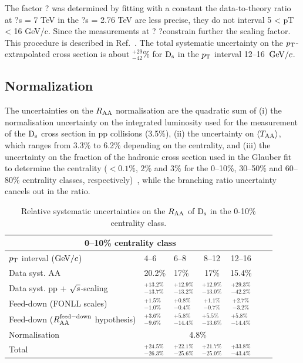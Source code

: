 The factor ? was determined by fitting with a constant the data-to-theory ratio at ?s = 7 TeV in the
?s = 2.76 TeV are less precise, they do not interval 5 < pT < 16 GeV/c. Since the measurements at ?
?constrain further the scaling factor. 
\fi
This procedure is described in Ref.~\cite{Adam:2015sza}. The total 
systematic uncertainty on the $p_{\rm T}$-extrapolated cross section is about 
$^{+29}_{-42}\%$ for ${\rm D_s}$ in the $p_{\rm T}$ interval 12--16~$\mathrm{GeV}/c$.


\subsection{Normalization}
\label{sec:NormalizSyst}
The uncertainties on the $R_{\rm AA}$ normalisation are the quadratic sum of 
(i) the normalisation uncertainty on the integrated luminosity used for the measurement of the ${\rm D_s}$ cross section in pp collisions (3.5\%), 
(ii) the uncertainty on $\langle T_{\rm AA} \rangle$, which ranges from 3.3\% to 6.2\% depending on the centrality, and
(iii) the uncertainty on the fraction of the hadronic cross section used in the 
Glauber fit to determine the centrality ($<0.1\%$, $2\%$ and $3\%$ for the 0--10\%, 30--50\% 
and 60--80\% centrality classes, respectively)~\cite{Adam:2015sza}, while the branching ratio uncertainty cancels out in the 
ratio.

\begin{table}[!h]
\centering
\begin{tabular}{|l|l|l|c|c|c|c|}
\hline
\multicolumn{5}{|c|}{0--10\% centrality class}       \\                                                                                                                                                                                                                                               \hline
$p_{\rm T}$ interval ($\mathrm{GeV}/c$)         &    4--6          & 6--8      &   8--12            & 12--16                  \\ 
\hline
Data syst. AA          & 20.2\%& 17\%& 17\%& 15.4\%\\
Data syst. pp + $\sqrt{s}$-scaling     & $^{+13.2\%}_{-13.7\%}$  &$^{+12.9\%}_{-13.2\%}$ &$^{+12.9\%}_{-13.0\%} $ &$^{+29.3\%}_{-42.2\%}$  \\
Feed-down (FONLL scales)    &  $^{+1.5\%}_{-1.0\%}$& $^{+0.8\%}_{-0.4\%}$&  $^{+1.1\%}_{-0.7\%}$&  $^{+2.7\%}_{-3.2\%}$\\
Feed-down ($R_{\rm AA}^{\rm feed-down}$ hypothesis)          & $^{+3.6\%}_{-9.6\%}$& $^{+5.8\%}_{-14.4\%}$& $^{+5.5\%}_{-13.6\%}$& $^{+5.8\%}_{-14.4\%}$\\
\hline
Normalisation     & \multicolumn{4}{|c|}{4.8\%} \\
\hline
\hline
Total  & $^{+24.5\%}_{-26.3\%}$& $^{+22.1\%}_{-25.6\%}$& $^{+21.7\%}_{-25.0\%}$&$^{+33.8\%}_{-43.4\%}$\\
\hline
\end{tabular}
\caption{Relative systematic uncertainties on the $R_{\rm AA}$ of ${\rm D_s}$ in the 0-10\% centrality class.}
\label{tab:sysunc_yieldtable}
\end{table}

